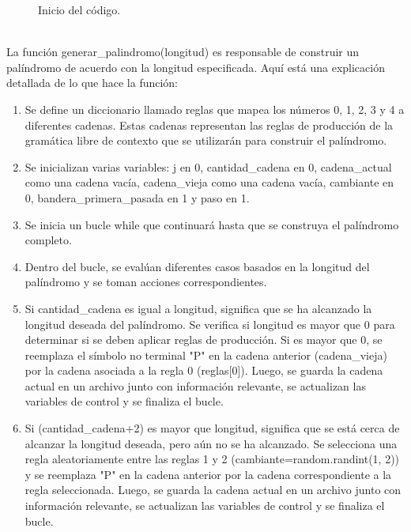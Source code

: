 \begin{figure}[h]
\begin{center}
\end{center}
\caption{Inicio del código.}
\label{fig:imagen}
\end{figure}
\\
La función generar\_palindromo(longitud) es responsable de construir un palíndromo de acuerdo con la longitud especificada. Aquí está una explicación detallada de lo que hace la función:

\begin{enumerate}
\item Se define un diccionario llamado reglas que mapea los números 0, 1, 2, 3 y 4 a diferentes cadenas. Estas cadenas representan las reglas de producción de la gramática libre de contexto que se utilizarán para construir el palíndromo.\newline

\item Se inicializan varias variables: j en 0, cantidad\_cadena en 0, cadena\_actual como una cadena vacía, cadena\_vieja como una cadena vacía, cambiante en 0, bandera\_primera\_pasada en 1 y paso en 1.\newline

\item Se inicia un bucle while que continuará hasta que se construya el palíndromo completo.\newline

\item Dentro del bucle, se evalúan diferentes casos basados en la longitud del palíndromo y se toman acciones correspondientes.\newline

\item Si cantidad\_cadena es igual a longitud, significa que se ha alcanzado la longitud deseada del palíndromo. Se verifica si longitud es mayor que 0 para determinar si se deben aplicar reglas de producción. Si es mayor que 0, se reemplaza el símbolo no terminal "P" en la cadena anterior (cadena\_vieja) por la cadena asociada a la regla 0 (reglas[0]). Luego, se guarda la cadena actual en un archivo junto con información relevante, se actualizan las variables de control y se finaliza el bucle.\newline

\item Si (cantidad\_cadena+2) es mayor que longitud, significa que se está cerca de alcanzar la longitud deseada, pero aún no se ha alcanzado. Se selecciona una regla aleatoriamente entre las reglas 1 y 2 (cambiante=random.randint(1, 2)) y se reemplaza "P" en la cadena anterior por la cadena correspondiente a la regla seleccionada. Luego, se guarda la cadena actual en un archivo junto con información relevante, se actualizan las variables de control y se finaliza el bucle.\newline


\end{enumerate}
